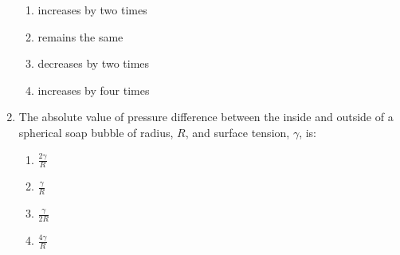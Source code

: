 \documentclass[journal]{IEEEtran}
\begin{document}
\begin{enumerate}[start=1]
\begin{enumerate}
   \item increases by two times
   \item remains the same  
   \item decreases by two times
   \item increases by four times
\end{enumerate}
\item The absolute value of pressure difference between the inside and outside of a spherical soap bubble of radius, $R$, and surface tension, $\gamma$, is:
\begin{enumerate}
   \item $\frac{2\gamma}{R}$
   \item $\frac{\gamma}{R}$
   \item $\frac{\gamma}{2R}$
   \item $\frac{4\gamma}{R}$
\end{enumerate}
\end{enumerate}
\end{document}
